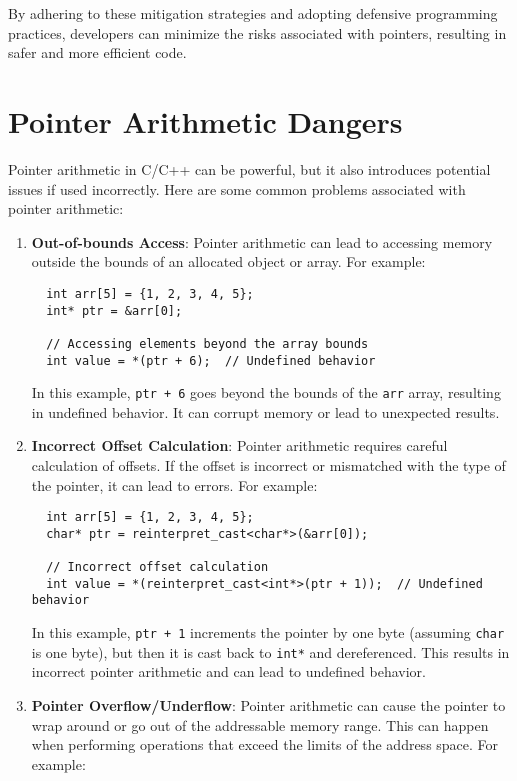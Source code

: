 \documentclass{article}
\begin{document}
\begin{enumerate}
By adhering to these mitigation strategies and adopting defensive programming practices, developers can minimize the risks associated with pointers, resulting in safer and more efficient code.

\section*{Pointer Arithmetic Dangers}

Pointer arithmetic in C/C++ can be powerful, but it also introduces potential issues if used incorrectly. Here are some common problems associated with pointer arithmetic:

\begin{enumerate}
  \item \textbf{Out-of-bounds Access}: Pointer arithmetic can lead to accessing memory outside the bounds of an allocated object or array. For example:
  
  \begin{verbatim}
  int arr[5] = {1, 2, 3, 4, 5};
  int* ptr = &arr[0];
  
  // Accessing elements beyond the array bounds
  int value = *(ptr + 6);  // Undefined behavior
  \end{verbatim}
  
  In this example, \texttt{ptr + 6} goes beyond the bounds of the \texttt{arr} array, resulting in undefined behavior. It can corrupt memory or lead to unexpected results.
  
  \item \textbf{Incorrect Offset Calculation}: Pointer arithmetic requires careful calculation of offsets. If the offset is incorrect or mismatched with the type of the pointer, it can lead to errors. For example:
  
  \begin{verbatim}
  int arr[5] = {1, 2, 3, 4, 5};
  char* ptr = reinterpret_cast<char*>(&arr[0]);
  
  // Incorrect offset calculation
  int value = *(reinterpret_cast<int*>(ptr + 1));  // Undefined behavior
  \end{verbatim}
  
  In this example, \texttt{ptr + 1} increments the pointer by one byte (assuming \texttt{char} is one byte), but then it is cast back to \texttt{int*} and dereferenced. This results in incorrect pointer arithmetic and can lead to undefined behavior.
  
  \item \textbf{Pointer Overflow/Underflow}: Pointer arithmetic can cause the pointer to wrap around or go out of the addressable memory range. This can happen when performing operations that exceed the limits of the address space. For example:
  

\end{enumerate}
\end{enumerate}
\end{document}

